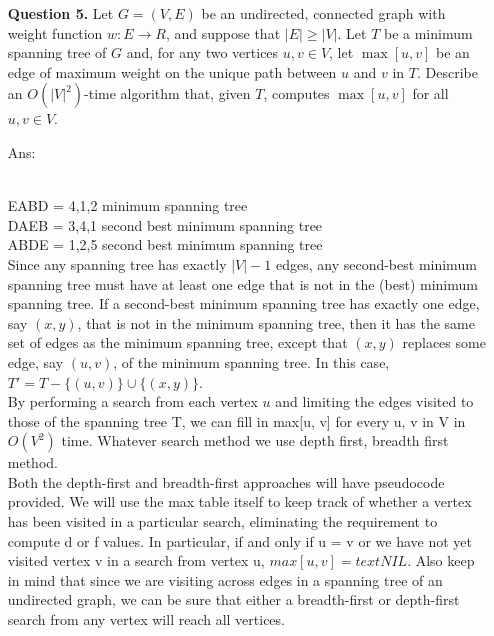 \documentclass[10pt,letterpaper]{article}
\begin{document}
\begin{itemize}
\item[{\bf Question 5.}] Let $G=(V,E)$ be an undirected, connected graph with weight
  function $w: E\rightarrow R$, and suppose that $|E|\ge |V|$. Let $T$
  be a minimum spanning tree of $G$ and, for any two vertices $u,v\in
  V$, let $\max[u,v]$ be an edge of maximum weight on the unique path
  between $u$ and $v$ in $T$.  Describe an $O(|V|^2)$-time algorithm
  that, given $T$, computes $\max[u,v]$ for all $u,v\in V$. \\
\item[Ans: ] 
 \\

EABD = 4,1,2 minimum spanning tree\\
DAEB = 3,4,1 second best minimum spanning tree\\
ABDE = 1,2,5 second best minimum spanning tree\\

Since any spanning tree has exactly $|V| - 1$ edges, any second-best minimum spanning tree must have at least one edge that is not in the (best) minimum spanning tree. If a second-best minimum spanning tree has exactly one edge, say $(x, y)$, that is not in the minimum spanning tree, then it has the same set of edges as the minimum spanning tree, except that $(x, y)$ replaces some edge, say $(u, v)$, of the minimum spanning tree. In this case, $T' = T - \{(u, v)\} \cup \{(x, y)\}$.\\

By performing a search from each vertex $u$ and limiting the edges visited to those of the spanning tree T, we can fill in max[u, v] for every u, v in V in $O(V^2)$ time. Whatever search method we use depth first, breadth first method.\\

Both the depth-first and breadth-first approaches will have pseudocode provided. We will use the max table itself to keep track of whether a vertex has been visited in a particular search, eliminating the requirement to compute d or f values. In particular, if and only if u = v or we have not yet visited vertex v in a search from vertex u, $max[u, v] = textNIL$. Also keep in mind that since we are visiting across edges in a spanning tree of an undirected graph, we can be sure that either a breadth-first or depth-first search from any vertex will reach all vertices.\\


\end{itemize}
\end{document}
